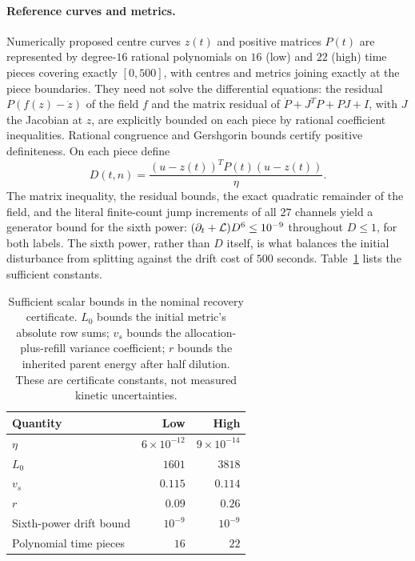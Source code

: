\paragraph{Reference curves and metrics.}
Numerically proposed centre curves $z(t)$ and positive matrices $P(t)$ are represented by degree-$16$ rational polynomials on $16$ (low) and $22$ (high) time pieces covering exactly $[0,500]$, with centres and metrics joining exactly at the piece boundaries. They need not solve the differential equations: the residual $P(f(z)-\dot z)$ of the field $f$ and the matrix residual of $\dot P+J^TP+PJ+I$, with $J$ the Jacobian at $z$, are explicitly bounded on each piece by rational coefficient inequalities. Rational congruence and Gershgorin bounds certify positive definiteness. On each piece define
\[
 D(t,n)=\frac{(u-z(t))^TP(t)(u-z(t))}{\eta}.
\]
The matrix inequality, the residual bounds, the exact quadratic remainder of the field, and the literal finite-count jump increments of all $27$ channels yield a generator bound for the sixth power: $(\partial_t+\mathcal L)D^6\le10^{-9}$ throughout $D\le1$, for both labels. The sixth power, rather than $D$ itself, is what balances the initial disturbance from splitting against the drift cost of $500$ seconds. Table~\ref{tab:metric} lists the sufficient constants.

\begin{table}[t]
\centering
\caption{Sufficient scalar bounds in the nominal recovery certificate. $L_0$ bounds the initial metric's absolute row sums; $v_s$ bounds the allocation-plus-refill variance coefficient; $r$ bounds the inherited parent energy after half dilution. These are certificate constants, not measured kinetic uncertainties.}\label{tab:metric}
\begin{tabular}{@{}lrr@{}}\toprule
Quantity & Low & High\\\midrule
$\eta$ & $6\times10^{-12}$ & $9\times10^{-14}$\\
$L_0$ & $1601$ & $3818$\\
$v_s$ & $0.115$ & $0.114$\\
$r$ & $0.09$ & $0.26$\\
Sixth-power drift bound & $10^{-9}$ & $10^{-9}$\\
Polynomial time pieces & $16$ & $22$\\\bottomrule
\end{tabular}
\end{table}

